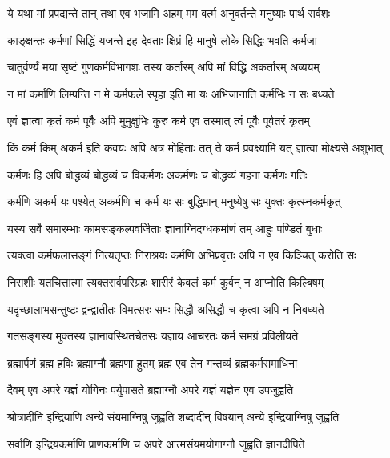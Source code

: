 \twolineshloka
{ये यथा मां प्रपद्यन्ते तान् तथा एव भजामि अहम्}
{मम वर्त्म अनुवर्तन्ते मनुष्याः पार्थ सर्वशः}%

\twolineshloka
{काङ्क्षन्तः कर्मणां सिद्धिं यजन्ते इह देवताः}
{क्षिप्रं हि मानुषे लोके सिद्धिः भवति कर्मजा}%

\twolineshloka
{चातुर्वर्ण्यं मया सृष्टं गुणकर्मविभागशः}
{तस्य कर्तारम् अपि मां विद्धि अकर्तारम् अव्ययम्}%

\twolineshloka
{न मां कर्माणि लिम्पन्ति न मे कर्मफले स्पृहा}
{इति मां यः अभिजानाति कर्मभिः न सः बध्यते}%

\twolineshloka
{एवं ज्ञात्वा कृतं कर्म पूर्वैः अपि मुमुक्षुभिः}
{कुरु कर्म एव तस्मात् त्वं पूर्वैः पूर्वतरं कृतम्}%

\twolineshloka
{किं कर्म किम् अकर्म इति कवयः अपि अत्र मोहिताः}
{तत् ते कर्म प्रवक्ष्यामि यत् ज्ञात्वा मोक्ष्यसे अशुभात्}%

\twolineshloka
{कर्मणः हि अपि बोद्धव्यं बोद्धव्यं च विकर्मणः}
{अकर्मणः च बोद्धव्यं गहना कर्मणः गतिः}%

\twolineshloka
{कर्मणि अकर्म यः पश्येत् अकर्मणि च कर्म यः}
{सः बुद्धिमान् मनुष्येषु सः युक्तः कृत्स्नकर्मकृत्}%

\twolineshloka
{यस्य सर्वे समारम्भाः कामसङ्कल्पवर्जिताः}
{ज्ञानाग्निदग्धकर्माणं तम् आहुः पण्डितं बुधाः}%

\twolineshloka
{त्यक्त्वा कर्मफलासङ्गं नित्यतृप्तः निराश्रयः}
{कर्मणि अभिप्रवृत्तः अपि न एव किञ्चित् करोति सः}%

\twolineshloka
{निराशीः यतचित्तात्मा त्यक्तसर्वपरिग्रहः}
{शारीरं केवलं कर्म कुर्वन् न आप्नोति किल्बिषम्}%

\twolineshloka
{यदृच्छालाभसन्तुष्टः द्वन्द्वातीतः विमत्सरः}
{समः सिद्धौ असिद्धौ च कृत्वा अपि न निबध्यते}%

\twolineshloka
{गतसङ्गस्य मुक्तस्य ज्ञानावस्थितचेतसः}
{यज्ञाय आचरतः कर्म समग्रं प्रविलीयते}%

\twolineshloka
{ब्रह्मार्पणं ब्रह्म हविः ब्रह्माग्नौ ब्रह्मणा हुतम्}
{ब्रह्म एव तेन गन्तव्यं ब्रह्मकर्मसमाधिना}%

\twolineshloka
{दैवम् एव अपरे यज्ञं योगिनः पर्युपासते}
{ब्रह्माग्नौ अपरे यज्ञं यज्ञेन एव उपजुह्वति}%

\twolineshloka
{श्रोत्रादीनि इन्द्रियाणि अन्ये संयमाग्निषु जुह्वति}
{शब्दादीन् विषयान् अन्ये इन्द्रियाग्निषु जुह्वति}%

\twolineshloka
{सर्वाणि इन्द्रियकर्माणि प्राणकर्माणि च अपरे}
{आत्मसंयमयोगाग्नौ जुह्वति ज्ञानदीपिते}%

